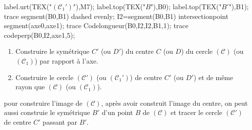 \begin{methode*1}
\begin{minipage}{0.45\linewidth}
\begin{center}
\begin{Geometrie}[CoinHD={(6.5u,5.5u)},CoinBG={(0,-0.5u)}]
                    label.urt(TEX("$(\mathcal{C_1}')$"),M7);
                    label.top(TEX("$B$"),B0);
                    label.top(TEX("$B'$"),B1);
                    trace segment(B0,B1) dashed evenly;
                    I2=segment(B0,B1) intersectionpoint segment(axe0,axe1);
                    trace Codelongueur(B0,I2,I2,B1,1);
                    trace codeperp(B0,I2,axe1,5);
                \end{Geometrie}
            \end{center}
        \end{minipage}
        \begin{minipage}{0.55\linewidth}
            \begin{enumerate}
                \item Construire le symétrique $C'$ (ou $D'$) du centre $C$ (ou $D$) du cercle $(\mathcal{C})$ (ou $(\mathcal{C}_1)$) par rapport à l'axe.
                \item Construire le cercle $(\mathcal{C}')$ (ou $(\mathcal{C}_1')$) de centre $C'$ (ou $D'$) et de même rayon que $(\mathcal{C})$ (ou $(\mathcal{C}_1)$).                
            \end{enumerate}
            \begin{remarque}
                pour construire l'image de $(\mathcal{C})$, après avoir construit l'image du centre, on peut aussi construie le symétrique $B'$ d'un point $B$ de $(\mathcal{C})$
                et tracer le cercle $(\mathcal{C}')$ de centre $C'$ passant par $B'$.
            \end{remarque}
        \end{minipage}
        \begin{myBox}{}
            \begin{minipage}{\linewidth}

                \medskip
            
                \creditInstrumentPoche
            \end{minipage}
        \end{myBox}
    \end{methode*1}
